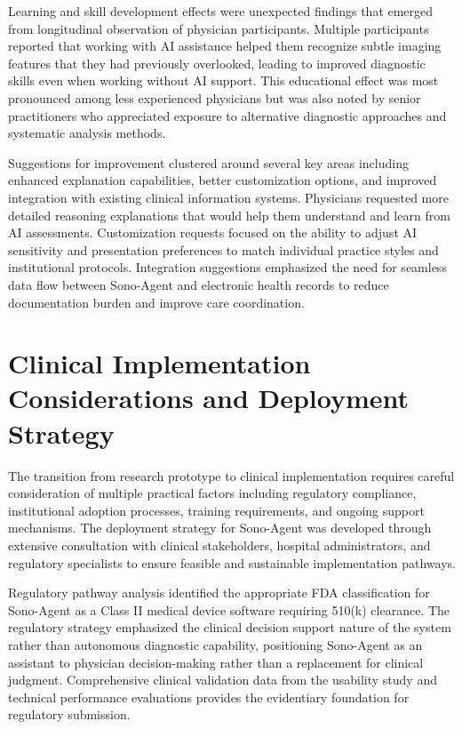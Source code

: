 Learning and skill development effects were unexpected findings that emerged from longitudinal observation of physician participants. Multiple participants reported that working with AI assistance helped them recognize subtle imaging features that they had previously overlooked, leading to improved diagnostic skills even when working without AI support. This educational effect was most pronounced among less experienced physicians but was also noted by senior practitioners who appreciated exposure to alternative diagnostic approaches and systematic analysis methods.

Suggestions for improvement clustered around several key areas including enhanced explanation capabilities, better customization options, and improved integration with existing clinical information systems. Physicians requested more detailed reasoning explanations that would help them understand and learn from AI assessments. Customization requests focused on the ability to adjust AI sensitivity and presentation preferences to match individual practice styles and institutional protocols. Integration suggestions emphasized the need for seamless data flow between Sono-Agent and electronic health records to reduce documentation burden and improve care coordination.

\section{Clinical Implementation Considerations and Deployment Strategy}

The transition from research prototype to clinical implementation requires careful consideration of multiple practical factors including regulatory compliance, institutional adoption processes, training requirements, and ongoing support mechanisms. The deployment strategy for Sono-Agent was developed through extensive consultation with clinical stakeholders, hospital administrators, and regulatory specialists to ensure feasible and sustainable implementation pathways.

Regulatory pathway analysis identified the appropriate FDA classification for Sono-Agent as a Class II medical device software requiring 510(k) clearance. The regulatory strategy emphasized the clinical decision support nature of the system rather than autonomous diagnostic capability, positioning Sono-Agent as an assistant to physician decision-making rather than a replacement for clinical judgment. Comprehensive clinical validation data from the usability study and technical performance evaluations provides the evidentiary foundation for regulatory submission.

